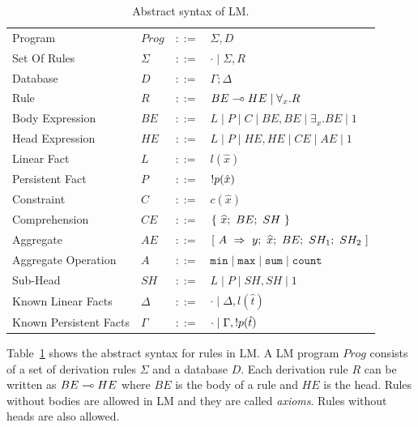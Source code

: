 \renewcommand{\arraystretch}{1.5}
\begin{table}[h]
\centering
\begin{tabular}{ l l c l }
  Program & $Prog$ & $::=$ & $\Sigma, D$ \\
  Set Of Rules & $\Sigma$ & $::=$ & $\cdot \; | \; \Sigma, R$\\
  Database & $D$ & $::=$ & $\Gamma; \Delta$ \\
  Rule & $R$ & $::=$ & $BE \multimap HE \; | \; \forall_{x}. R$ \\
  Body Expression & $BE$ & $::=$ & $L \; | \; P \; | \; C \; | \; BE, BE \; | \; \exists_{x}. BE \; | \; 1$\\
  Head Expression & $HE$ & $::=$ & $L \; | \; P \; | \; HE, HE \; | \; CE \; | \; AE \; | \; 1$\\
  
  Linear Fact & $L$ & $::=$ & $l(\hat{x})$\\
  Persistent Fact & $P$ & $::=$ & ${!} p(\hat{x})$\\
  Constraint & $C$ & $::=$ & $c(\hat{x})$ \\
  
  Comprehension & $CE$ & $::=$ & $\{~\widehat{x};~BE;~SH~\}$ \\
  Aggregate & $AE$ & $::=$ & $[~A~\Rightarrow~y;~\widehat{x};~BE;~SH_1;~SH_2~]$ \\
  Aggregate Operation & $A$ & $::=$ & $\mathtt{min} \; | \; \mathtt{max} \; | \; \mathtt{sum} \; | \; \mathtt{count}$ \\
  
  Sub-Head & $SH$ & $::=$ & $L \; | \; P \; | \; SH, SH \; | \; 1$\\
  
  Known Linear Facts & $\Delta$ & $::=$ & $\cdot \; | \; \Delta, l(\hat{t})$ \\
  Known Persistent Facts & $\Gamma$ & $::=$ & $\cdot \; | \; \Gamma, {!} p(\hat{t})$ \\
\end{tabular}
\caption{Abstract syntax of LM.}\label{tbl:ast}
\end{table}
\renewcommand{\arraystretch}{1.0}

Table~\ref{tbl:ast} shows the abstract syntax for rules in LM.
A LM program $Prog$ consists of a set of derivation rules $\Sigma$ and a database $D$.
Each derivation rule $R$ can be written as $BE \multimap HE$ where $BE$ is the body of a rule and
$HE$ is the head. Rules without bodies are allowed in LM and they are called \textit{axioms}. Rules without heads are also allowed.

